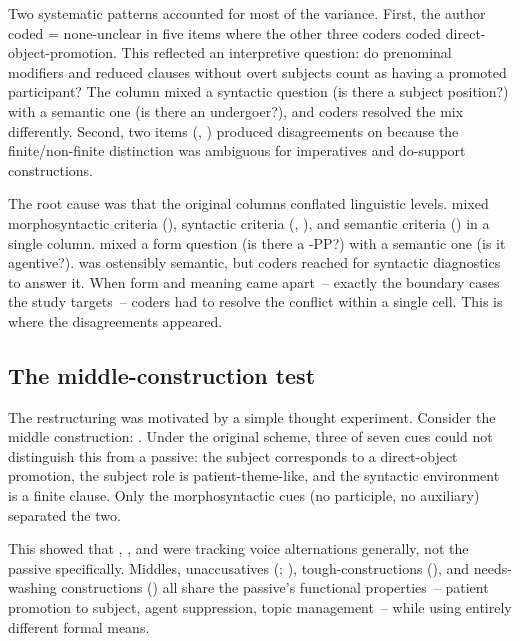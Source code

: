 \documentclass[12pt]{article}
\begin{document}
Two systematic patterns accounted for most of the variance. First, the author coded  = none-unclear in five items where the other three coders coded direct-object-promotion. This reflected an interpretive question: do prenominal modifiers and reduced clauses without overt subjects count as having a promoted participant? The column mixed a syntactic question (is there a subject position?) with a semantic one (is there an undergoer?), and coders resolved the mix differently. Second, two items (, ) produced disagreements on  because the finite/non-finite distinction was ambiguous for imperatives and do-support constructions.

The root cause was that the original columns conflated linguistic levels.  mixed morphosyntactic criteria (), syntactic criteria (, ), and semantic criteria () in a single column.  mixed a form question (is there a -PP?) with a semantic one (is it agentive?).  was ostensibly semantic, but coders reached for syntactic diagnostics to answer it. When form and meaning came apart~-- exactly the boundary cases the study targets~-- coders had to resolve the conflict within a single cell. This is where the disagreements appeared.

\subsection{The middle-construction test}

The restructuring was motivated by a simple thought experiment. Consider the middle construction: . Under the original scheme, three of seven cues could not distinguish this from a passive: the subject corresponds to a direct-object promotion, the subject role is patient-theme-like, and the syntactic environment is a finite clause. Only the morphosyntactic cues (no participle, no auxiliary) separated the two.

This showed that , , and  were tracking voice alternations generally, not the passive specifically. Middles, unaccusatives (; ), tough-constructions (), and needs-washing constructions () all share the passive's functional properties~-- patient promotion to subject, agent suppression, topic management~-- while using entirely different formal means.
\end{document}
